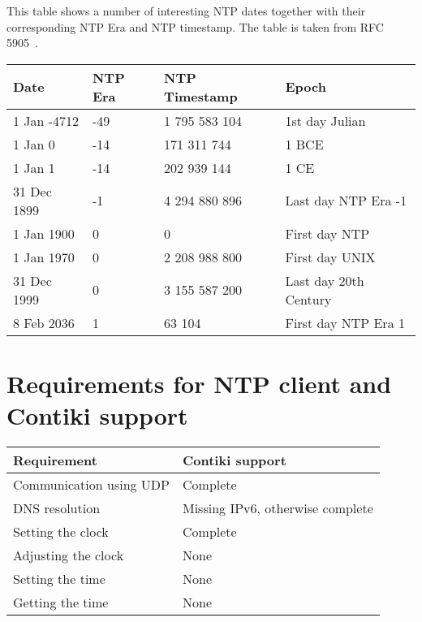This table shows a number of interesting NTP dates
together with their corresponding NTP Era and NTP timestamp.
The table is taken from RFC 5905~\cite{rfc5905}.

\vspace{1cm}

\begin{tabular}{|l|l|l|l|}
	\hline
	Date & NTP Era & NTP Timestamp & Epoch \\ \hline
	1 Jan -4712 & -49 & 1 795 583 104 & 1st day Julian \\
	1 Jan 0 & -14 & 171 311 744 & 1 BCE \\
	1 Jan 1 & -14 & 202 939 144 & 1 CE \\
	31 Dec 1899 & -1 & 4 294 880 896 & Last day NTP Era -1 \\
	1 Jan 1900 & 0 & 0 & First day NTP \\
	1 Jan 1970 & 0 & 2 208 988 800 & First day UNIX \\
	31 Dec 1999 & 0 & 3 155 587 200 & Last day 20th Century \\
	8 Feb 2036 & 1 & 63 104 & First day NTP Era 1 \\
	\hline
\end{tabular}

\chapter{Requirements for NTP client and Contiki support}\label{app:requirements}
\begin{tabular}{|l|l|}
	\hline
	Requirement & Contiki support \\ \hline
	Communication using UDP & Complete \\
	DNS resolution & Missing IPv6, otherwise complete \\
	Setting the clock & Complete \\
	Adjusting the clock & None \\
	Setting the time & None \\
	Getting the time & None \\
	\hline
\end{tabular}

